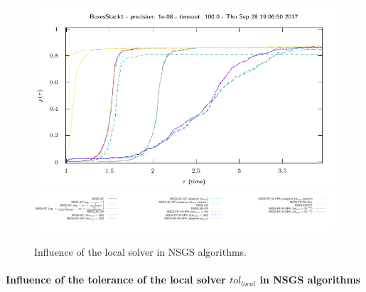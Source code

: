 \begin{figure}
  \includegraphics[width=\figwidth]{../figure/NSGS/LocalSolver/1.0e-08/100/time/profile-BoxesStack1.pdf} 
  \includegraphics[width=\legendwidth]{../figure/NSGS/LocalSolver/1.0e-08/100/time/profile-BoxesStack1_legend.pdf} 
  \caption{Influence of the local solver in NSGS algorithms.}
  \label{fig:NSGS/LocalSolver/time}
\end{figure}

\paragraph{Influence of the tolerance of the local solver $tol_{local}$ in NSGS algorithms}

